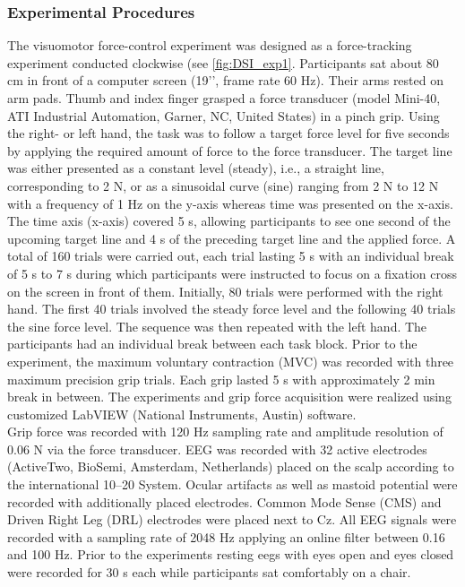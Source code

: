 \subsubsection{Experimental Procedures}
\label{methods:datasets:I:experiment}
The visuomotor force-control experiment was designed as a force-tracking experiment conducted clockwise (see \autoref{fig:DSI_exp1}. Participants sat about 80 cm in front of a computer screen (19’’, frame rate 60 Hz). Their arms rested on arm pads. Thumb and index finger grasped a force transducer (model Mini-40, ATI Industrial Automation, Garner, NC, United States) in a pinch grip. Using the right- or left hand, the task was to follow a target force level for five seconds by applying the required amount of force to the force transducer. The target line was either presented as a constant level (steady), i.e., a straight line, corresponding to 2 N, or as a sinusoidal curve (sine) ranging from 2 N to 12 N with a frequency of 1 Hz on the y-axis whereas time was presented on the x-axis. The time axis (x-axis) covered 5 s, allowing participants to see one second of the upcoming target line and 4 s of the preceding target line and the applied force. A total of 160 trials were carried out, each trial lasting 5 s with an individual break of 5 s to 7 s during which participants were instructed to focus on a fixation cross on the screen in front of them. Initially, 80 trials were performed with the right hand. The first 40 trials involved the steady force level and the following 40 trials the sine force level. The sequence was then repeated with the left hand. The participants had an individual break between each task block. Prior to the experiment, the maximum voluntary contraction (MVC) was recorded with three maximum precision grip trials. Each grip lasted 5 s with approximately 2 min break in between. The experiments and grip force acquisition were realized using customized LabVIEW (National Instruments, Austin) software.\\
Grip force was recorded with 120 Hz sampling rate and amplitude resolution of 0.06 N via the force transducer.
EEG was recorded with 32 active electrodes (ActiveTwo, BioSemi, Amsterdam, Netherlands) placed on the scalp according to the international 10–20 System. Ocular artifacts as well as mastoid potential were recorded with additionally placed electrodes. Common Mode Sense (CMS) and Driven Right Leg (DRL) electrodes were placed next to Cz. All EEG signals were recorded with a sampling rate of 2048 Hz applying an online filter between 0.16 and 100 Hz. Prior to the experiments resting \glspl{eeg} with eyes open and eyes closed were recorded for 30 s each while participants sat comfortably on a chair.

